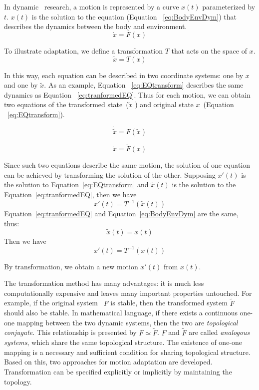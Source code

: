 In dynamic \cms\ research, a motion is represented by  a curve  $x(t)$ parameterized by $t$.
$x(t)$ is the solution to the equation (Equation ~\ref{eq:BodyEnvDym}) that describes the dynamics between the body and environment.
\begin{equation}
\dot{x}=F(x)
\label{eq:BodyEnvDym}
\end{equation}


To illustrate adaptation, we define a transformation $T$ that acts on the space of $x$.
\[
\tilde{x}=T(x)
\]

In this way, each equation can be described in two coordinate systems: one by $x$ and one by $\tilde{x}$.
As an example, Equation ~\ref{eq:EQtransform} describes the same dynamics as  Equation ~\ref{eq:tranformedEQ}.
Thus for each motion, we can obtain two equations of the transformed state~($\tilde{x}$ ) and original state $x$~(Equation ~\ref{eq:EQtransform}).

\begin{equation}
\dot{\tilde{x}}=F(\tilde{x})
\label{eq:tranformedEQ}
\end{equation}

\begin{equation}
\dot{x}=\tilde{F}(x)
\label{eq:EQtransform}
\end{equation}

Since such two equations describe the same motion, the solution of one equation can be achieved by transforming the solution of the other.
Supposing $x'(t)$ is the solution to Equation~\ref{eq:EQtransform} and $\tilde{x}(t)$ is the solution to the Equation~\ref{eq:tranformedEQ}, then we have
\[
x'(t)=T^{-1}(\tilde{x}(t))
\]
Equation~\ref{eq:tranformedEQ} and Equation~\ref{eq:BodyEnvDym} are the same, thus: 
\[
\tilde{x}(t)=x(t)
\]
Then we have
\[
x'(t)=T^{-1}(x(t))
\]

By transformation, we obtain a new motion $x'(t)$ from $x(t)$.





%
%
The  transformation method has many advantages: it is much less computationally expensive and leaves many important properties untouched.
For example, if the original system ~$F$ is stable, then the transformed system $\tilde{F}$ should also be stable. 
%
In mathematical language, if there exists a continuous one-one mapping between the two dynamic systems, then the two are \emph{topological conjugate}.
This relationship is presented by $F \simeq \tilde{F}$.
$F$ and $\tilde{F}$ are called \emph{analogous systems}, which share the same topological structure.
The existence of one-one mapping is a necessary and sufficient condition for sharing topological structure.
Based on this, two  approaches for motion adaptation are developed.
Transformation can be specified explicitly or implicitly by maintaining the topology.



